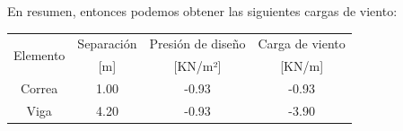 \documentclass[../main.tex]{subfiles}
\begin{document}
\clearpage

En resumen, entonces podemos obtener las siguientes cargas de viento:

\begin{table}[htbp]
  \centering
    \begin{tabular}{|c|c|cc|cc|}
    \hline
    \multirow{2}[2]{*}{Elemento} & \cellcolor[rgb]{ .851,  .882,  .949}Separación & \multicolumn{2}{c|}{\cellcolor[rgb]{ .851,  .882,  .949}Presión de diseño} & \multicolumn{2}{c|}{\cellcolor[rgb]{ .851,  .882,  .949}Carga de viento} \bigstrut[t]\\
          & \cellcolor[rgb]{ .929,  .929,  .929}[m] & \multicolumn{2}{c|}{\cellcolor[rgb]{ .929,  .929,  .929}[KN/m²]} & \multicolumn{2}{c|}{\cellcolor[rgb]{ .929,  .929,  .929}[KN/m]} \bigstrut[b]\\
    \hline
    \rowcolor[rgb]{ .929,  .929,  .929} Correa & \cellcolor[rgb]{ 1,  1,  1}1.00 & \multicolumn{2}{c|}{\cellcolor[rgb]{ 1,  1,  1}-0.93} & \multicolumn{2}{c|}{\cellcolor[rgb]{ 1,  1,  1}-0.93} \bigstrut[t]\\
    \rowcolor[rgb]{ .929,  .929,  .929} Viga  & \cellcolor[rgb]{ 1,  1,  1}4.20 & \multicolumn{2}{c|}{\cellcolor[rgb]{ 1,  1,  1}-0.93} & \multicolumn{2}{c|}{\cellcolor[rgb]{ 1,  1,  1}-3.90} \bigstrut[b]\\
    \hline
    \end{tabular}%
  \label{tab:addlabel}%
\end{table}%
\end{document}
